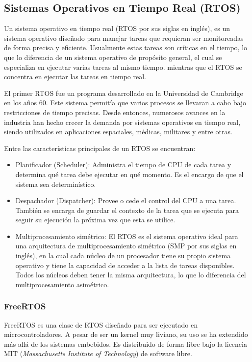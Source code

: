 \subsection{Sistemas Operativos en Tiempo Real (RTOS)} 
\label{subsec:rtossubsec}

Un sistema operativo en tiempo real (RTOS por sus siglas en inglés), es un sistema operativo diseñado para manejar tareas que requieran ser monitoreadas de forma precisa y eficiente. Usualmente estas tareas son críticas en el tiempo, lo que lo diferencia de un sistema operativo de propósito general, el cual se especializa en ejecutar varias tareas al mismo tiempo. mientras que el RTOS se concentra en ejecutar las tareas en tiempo real.

El primer RTOS fue un programa desarrollado en la Universidad de Cambridge en los años 60. Este sistema permitía que varios procesos se llevaran a cabo bajo restricciones de tiempo precisas. Desde entonces, numerosos avances en la industria han hecho crecer la demanda por sistemas operativos en tiempo real, siendo utilizados en aplicaciones espaciales, médicas, militares y entre otras.

Entre las características principales de un RTOS se encuentran:

\begin{itemize}
    \item Planificador (Scheduler): Administra el tiempo de CPU de cada tarea y determina qué tarea debe ejecutar en qué momento. Es el encargo de que el sistema sea determinístico.
    \item Despachador (Dispatcher): Provee o cede el control del CPU a una tarea. También se encarga de guardar el contexto de la tarea que se ejecuta para seguir su ejecución la próxima vez que esta se utilice.
    \item Multiprocesamiento simétrico: El RTOS es el sistema operativo ideal para una arquitectura de multiprocesamiento simétrico (SMP por sus siglas en inglés), en la cual cada núcleo de un procesador tiene su propio sistema operativo y tiene la capacidad de acceder a la lista de tareas disponibles. Todos los núcleos deben tener la misma arquitectura, lo que lo diferencia del multiprocesamiento asimétrico.
\end{itemize}

\subsubsection{FreeRTOS} FreeRTOS es una clase de RTOS diseñado para ser ejecutado en microcontroladores. A pesar de ser un kernel muy liviano, su uso se ha extendido más allá de los sistemas embebidos. Es distribuido de forma libre bajo la licencia MIT (\textit{Massachusetts Institute of Technology}) de software libre.

